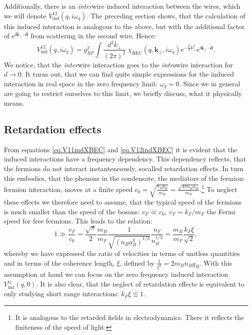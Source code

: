 Additionally, there is an \textit{inter}wire induced interaction between the wires, which we will denote $V_{\text{ind}}^{12}(q,i\omega_q)$. The preceding section shows, that the calculation of this induced interaction is analogous to the above, but with the additional factor of $\text{e}^{i\mathbf{k}_\perp\cdot \mathbf{d}}$ from scattering in the second wire. Hence:
\begin{equation}
V_{\text{ind}}^{12}(q,i\omega_q) = g_{BF}^2\int\frac{d^2k_\perp}{(2\pi)^2}\; \chi_\text{BEC}(q,\mathbf{k}_\perp, i\omega_q)\text{e}^{-\frac{l_t^2}{2}k_\perp^2}\text{e}^{i\mathbf{k}_\perp\cdot \mathbf{d}}. 
\label{eq.V12indXBEC} 
\end{equation}
We notice, that the \textit{inter}wire interaction goes to the \textit{intra}wire interaction for $d \to 0$. It turns out, that we can find quite simple expressions for the induced interaction in real space in the zero frequency limit: $\omega_q = 0$. Since we in general are going to restrict ourselves to this limit, we briefly discuss, what it physically means. 

\subsection{Retardation effects} \label{sec.RetardationEffects}
From equations \eqref{eq.V11indXBEC} and \eqref{eq.V12indXBEC} it is evident that the induced interactions have a frequency dependency. This dependency reflects, that the fermions do not interact instanteneously, socalled retardation effects. In turn this embodies, that the phonons in the condensate, the mediators of the fermion-fermion interaction, moves at a finite speed $c_0 = \sqrt{\frac{n_Bg_B}{m_B}} = \frac{\sqrt{4\pi n_B a_B}}{m_B}$.\footnote{It is analogous to the retarded fields in electrodynamics. There it reflects the finiteness of the speed of light.} To neglect these effects we therefore need to assume, that the typical speed of the fermions is much smaller than the speed of the bosons: $v_F \ll c_0$, $v_F = k_F/m_F$ the Fermi speed for free fermions. This leads to the relation:
\begin{equation}
1 \gg \frac{v_F}{c_0} = \frac{\sqrt{\pi}}{2} \frac{m_B}{m_F}\frac{1}{ \sqrt{ (n_Ba_B^3)^{1/3} } }\frac{n_F}{ n_B^{1/3} } = \frac{m_B}{m_F}\frac{k_F\xi}{\sqrt{2}}, 
\label{eq.RetardationEffectsneglectionassumption}
\end{equation}
whereby we have expressed the ratio of velocities in terms of unitless quantities and in terms of the coherence length, $\xi$, defined by $\frac{1}{\xi^2} = 2m_Bn_Bg_B$. With this assumption at hand we can focus on the zero frequency induced interaction $V^{ij}_{\text{ind}}(q,0)$. It is also clear, that the neglect of retardation effects is equivalent to only studying short range interactions: $k_F\xi \lesssim 1$. 

